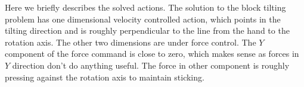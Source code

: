 Here we briefly describes the solved actions. The solution to the block tilting problem has one dimensional velocity controlled action, which points in the tilting direction and is roughly perpendicular to the line from the hand to the rotation axis. The other two dimensions are under force control. The $Y$ component of the force command is close to zero, which makes sense as forces in $Y$ direction don't do anything useful. The force in other component is roughly pressing against the rotation axis to maintain sticking.

